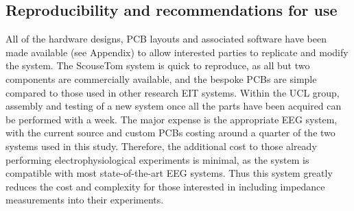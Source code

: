 \subsection{Reproducibility and recommendations for use}
All of the hardware designs, PCB layouts and associated software have been made available (see Appendix) to allow interested parties to replicate and modify the system. The ScouseTom system is quick to reproduce, as all but two components are commercially available, and the bespoke PCBs are simple compared to those used in other research EIT systems. Within the UCL group, assembly and testing of a new system once all the parts have been acquired can be performed with a week. The major expense is the appropriate EEG system, with the current source and custom PCBs costing around a quarter of the two systems used in this study. Therefore, the additional cost to those already performing electrophysiological experiments is minimal, as the system is compatible with most state-of-the-art EEG systems. Thus this system greatly reduces the cost and complexity for those interested in including impedance measurements into their experiments.